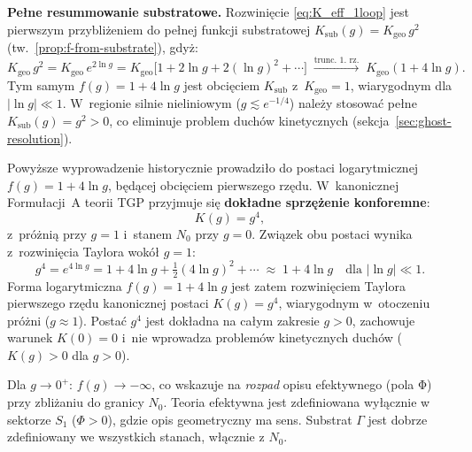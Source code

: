 \medskip\noindent
\textbf{Pełne resummowanie substratowe.}
Rozwinięcie \eqref{eq:K_eff_1loop} jest pierwszym przybliżeniem
do pełnej funkcji substratowej
$K_\mathrm{sub}(g) = K_\mathrm{geo}\,g^2$
(tw.~\ref{prop:f-from-substrate}), gdyż:
\begin{equation}
  K_\mathrm{geo}\,g^2
  = K_\mathrm{geo}\,e^{2\ln g}
  = K_\mathrm{geo}\bigl[1 + 2\ln g
    + 2(\ln g)^2 + \cdots\bigr]
  \;\xrightarrow{\text{trunc. 1. rz.}}\;
  K_\mathrm{geo}(1 + 4\ln g).
  \label{eq:Ksub_expansion_check}
\end{equation}
Tym samym $f(g) = 1 + 4\ln g$ jest obcięciem $K_\mathrm{sub}$
z~$K_\mathrm{geo} = 1$, wiarygodnym dla $|\ln g| \ll 1$.
W~regionie silnie nieliniowym ($g \lesssim e^{-1/4}$) należy
stosować pełne $K_\mathrm{sub}(g) = g^2 > 0$, co eliminuje
problem duchów kinetycznych (sekcja~\ref{sec:ghost-resolution}).

\begin{uwaga}[Nota kanoniczna: $K(g) = g^4$ jako dokładne sprzężenie konforemne]
\label{rem:canonical_g4}
Powyższe wyprowadzenie historycznie prowadziło do postaci logarytmicznej
$f(g) = 1 + 4\ln g$, będącej obcięciem pierwszego rzędu. W~kanonicznej
Formułacji~A teorii TGP przyjmuje się \textbf{dokładne sprzężenie konforemne}:
\begin{equation}
  K(g) = g^4,
  \label{eq:K_canonical_g4}
\end{equation}
z~próżnią przy $g = 1$ i~stanem $N_0$ przy $g = 0$.
Związek obu postaci wynika z~rozwinięcia Taylora wokół $g = 1$:
\begin{equation}
  g^4 = e^{4\ln g}
  = 1 + 4\ln g + \tfrac{1}{2}(4\ln g)^2 + \cdots
  \;\approx\; 1 + 4\ln g
  \quad\text{dla } |\ln g| \ll 1.
\end{equation}
Forma logarytmiczna $f(g) = 1 + 4\ln g$ jest zatem rozwinięciem Taylora
pierwszego rzędu kanonicznej postaci $K(g) = g^4$, wiarygodnym w~otoczeniu
próżni ($g \approx 1$). Postać $g^4$ jest dokładna na całym zakresie $g > 0$,
zachowuje warunek $K(0) = 0$ i~nie wprowadza problemów kinetycznych duchów
($K(g) > 0$ dla $g > 0$).
\end{uwaga}

\begin{wniosek}
Dla $g \to 0^+$: $f(g) \to -\infty$, co wskazuje na \emph{rozpad}
opisu efektywnego (pola Φ) przy zbliżaniu do granicy $N_0$. Teoria
efektywna jest zdefiniowana wyłącznie w sektorze $S_1$ ($\Phi > 0$),
gdzie opis geometryczny ma sens. Substrat $\Gamma$ jest dobrze
zdefiniowany we wszystkich stanach, włącznie z $N_0$.
\end{wniosek}


